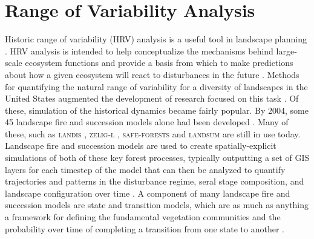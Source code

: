 \section{Range of Variability Analysis}

Historic range of variability (HRV) analysis is a useful tool in landscape planning \citep{Nonaka2005}. HRV analysis is intended to help conceptualize the mechanisms behind large-scale ecosystem functions and provide a basis from which to make predictions about how a given ecosystem will react to disturbances in the future \citep{Nonaka2005,Landres1999}. Methods for quantifying the natural range of variability for a diversity of landscapes in the United States augmented the development of research focused on this task \citep{Landres1999}. Of these, simulation of the historical dynamics became fairly popular. By 2004, some 45 landscape fire and succession models alone had been developed \citep{Keane2004}. Many of these, such as \textsc{landis} \citep{He1999}, \textsc{zelig-l} \citep{Miller1999}, \textsc{safe-forests} \cite{Sessions1997} and \textsc{landsum} \citep{Keane2012} are still in use today. Landscape fire and succession models are used to create spatially-explicit simulations of both of these key forest processes, typically outputting a set of GIS layers for each timestep of the model that can then be analyzed to quantify trajectories and patterns in the disturbance regime, seral stage composition, and landscape configuration over time \citep{Keane2004}. A component of many landscape fire and succession models are state and transition models, which are as much as anything a framework for defining the fundamental vegetation communities and the probability over time of completing a transition from one state to another \citep{Stringham2003,Blankenship2015}.

